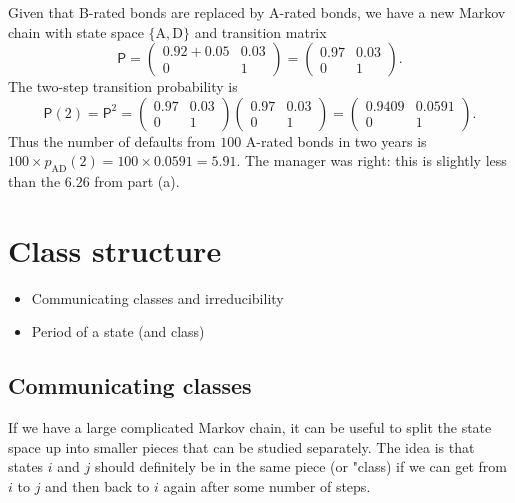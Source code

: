 \documentclass[
  a4paper,
]{article}
\providecommand{\tightlist}{%
  \setlength{\itemsep}{0pt}\setlength{\parskip}{0pt}}
\theoremstyle{definition}
\theoremstyle{definition}
\theoremstyle{definition}
\theoremstyle{remark}
\begin{document}
\begin{myanswers}

Given that B-rated bonds are replaced by A-rated bonds, we have a new Markov chain with state space \(\{\mathrm{A},\mathrm{D}\}\) and transition matrix
\[ \mathsf P = \begin{pmatrix} 0.92+0.05 & 0.03 \\ 0 & 1 \end{pmatrix} =  \begin{pmatrix} 0.97 & 0.03 \\ 0 & 1 \end{pmatrix} .  \]
The two-step transition probability is
\[ \mathsf P(2) = \mathsf P^2 =  \begin{pmatrix} 0.97 & 0.03 \\ 0 & 1 \end{pmatrix} \begin{pmatrix} 0.97 & 0.03 \\ 0 & 1 \end{pmatrix} = \begin{pmatrix} 0.9409 & 0.0591 \\ 0 & 1 \end{pmatrix} .  \]
Thus the number of defaults from \(100\) A-rated bonds in two years is \(100\times p_{\mathrm{AD}}(2) = 100\times 0.0591 = 5.91\). The manager was right: this is slightly less than the \(6.26\) from part (a).

\end{myanswers}

\hypertarget{S07-classes}{%
\section{Class structure}\label{S07-classes}}

\begin{itemize}
\tightlist
\item
  Communicating classes and irreducibility
\item
  Period of a state (and class)
\end{itemize}

\hypertarget{comm-classes}{%
\subsection{Communicating classes}\label{comm-classes}}

If we have a large complicated Markov chain, it can be useful to split the state space up into smaller pieces that can be studied separately. The idea is that states \(i\) and \(j\) should definitely be in the same piece (or "class) if we can get from \(i\) to \(j\) and then back to \(i\) again after some number of steps.
\end{document}
